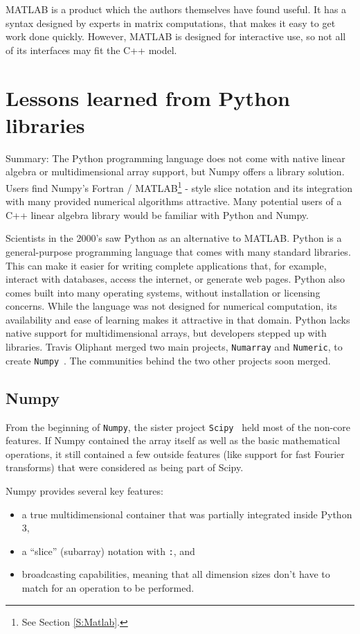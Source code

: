 MATLAB is a product which the authors themselves have found useful.
It has a syntax designed by experts in matrix computations, that makes
it easy to get work done quickly.  However, MATLAB is designed for
interactive use, so not all of its interfaces may fit the C++ model.

\section{Lessons learned from Python libraries}
\label{S:Python}

Summary: The Python programming language does not come with native
linear algebra or multidimensional array support, but Numpy offers a
library solution.  Users find Numpy's Fortran / MATLAB\footnote{See
  Section \ref{S:Matlab}.} - style slice notation and its integration
with many provided numerical algorithms attractive.  Many potential
users of a C++ linear algebra library would be familiar with Python
and Numpy.

Scientists in the 2000's saw Python as an alternative to MATLAB.
Python is a general-purpose programming language that comes with many
standard libraries.  This can make it easier for writing complete
applications that, for example, interact with databases, access the
internet, or generate web pages.  Python also comes built into many
operating systems, without installation or licensing concerns.  While
the language was not designed for numerical computation, its
availability and ease of learning makes it attractive in that domain.
Python lacks native support for multidimensional arrays, but
developers stepped up with libraries.  Travis Oliphant merged two main
projects, \texttt{Numarray} and \texttt{Numeric}, to create
\texttt{Numpy}~\cite{oliphant2006numpy}. The communities behind the
two other projects soon merged.

\subsection{Numpy}
\label{S:Python:numpy}

From the beginning of \texttt{Numpy}, the sister project
\texttt{Scipy}~\cite{scipy2001} held most of the non-core features.
If Numpy contained the array itself as well as the basic mathematical
operations, it still contained a few outside features (like support
for fast Fourier transforms) that were considered as being part of
Scipy.

Numpy provides several key features:
\begin{itemize}
  \item a true multidimensional container that was partially integrated
   inside Python 3,
  \item a ``slice'' (subarray) notation with \texttt{:}, and
  \item broadcasting capabilities, meaning that all dimension sizes
    don't have to match for an operation to be performed.
\end{itemize}


